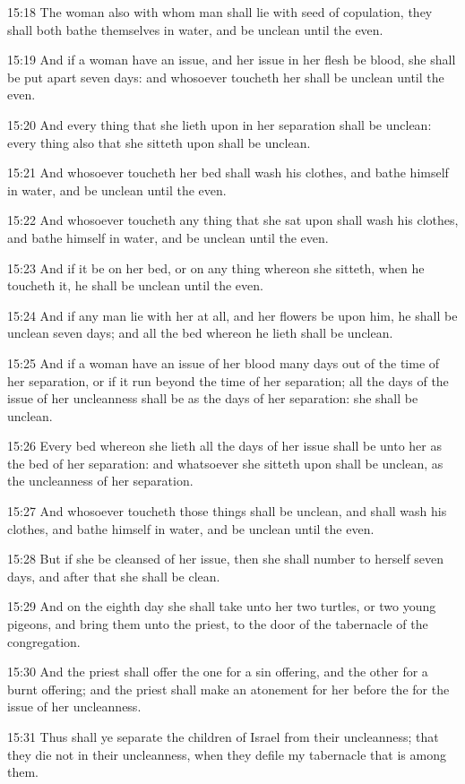 15:18 The woman also with whom man shall lie with seed of copulation, they shall both bathe themselves in water, and be unclean until the even.

15:19 And if a woman have an issue, and her issue in her flesh be blood, she shall be put apart seven days: and whosoever toucheth her shall be unclean until the even.

15:20 And every thing that she lieth upon in her separation shall be unclean: every thing also that she sitteth upon shall be unclean.

15:21 And whosoever toucheth her bed shall wash his clothes, and bathe himself in water, and be unclean until the even.

15:22 And whosoever toucheth any thing that she sat upon shall wash his clothes, and bathe himself in water, and be unclean until the even.

15:23 And if it be on her bed, or on any thing whereon she sitteth, when he toucheth it, he shall be unclean until the even.

15:24 And if any man lie with her at all, and her flowers be upon him, he shall be unclean seven days; and all the bed whereon he lieth shall be unclean.

15:25 And if a woman have an issue of her blood many days out of the time of her separation, or if it run beyond the time of her separation; all the days of the issue of her uncleanness shall be as the days of her separation: she shall be unclean.

15:26 Every bed whereon she lieth all the days of her issue shall be unto her as the bed of her separation: and whatsoever she sitteth upon shall be unclean, as the uncleanness of her separation.

15:27 And whosoever toucheth those things shall be unclean, and shall wash his clothes, and bathe himself in water, and be unclean until the even.

15:28 But if she be cleansed of her issue, then she shall number to herself seven days, and after that she shall be clean.

15:29 And on the eighth day she shall take unto her two turtles, or two young pigeons, and bring them unto the priest, to the door of the tabernacle of the congregation.

15:30 And the priest shall offer the one for a sin offering, and the other for a burnt offering; and the priest shall make an atonement for her before the \LORD for the issue of her uncleanness.

15:31 Thus shall ye separate the children of Israel from their uncleanness; that they die not in their uncleanness, when they defile my tabernacle that is among them.

